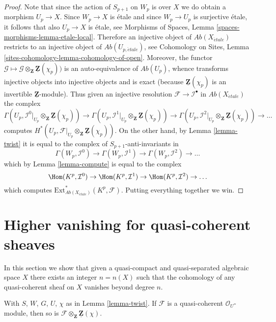 \begin{proof}
Note that since the action of $S_{p + 1}$ on $W_p$ is over $X$ we do
obtain a morphism $U_p \to X$. Since $W_p \to X$ is \'etale and since
$W_p \to U_p$ is surjective \'etale, it follows
that also $U_p \to X$ is \'etale, see
Morphisms of Spaces, Lemma \ref{spaces-morphisms-lemma-etale-local}.
Therefore an injective object of
$\textit{Ab}(X_{\acute{e}tale})$ restricts to an injective object of
$\textit{Ab}(U_{p, \acute{e}tale})$, see
Cohomology on Sites, Lemma \ref{sites-cohomology-lemma-cohomology-of-open}.
Moreover, the functor
$\mathcal{G} \mapsto
\mathcal{G} \otimes_\mathbf{Z} \underline{\mathbf{Z}}(\chi_p))$
is an auto-equivalence of $\textit{Ab}(U_p)$, whence transforms injective
objects into injective objects and is exact (because
$\underline{\mathbf{Z}}(\chi_p)$ is an invertible
$\underline{\mathbf{Z}}$-module). Thus given an injective resolution
$\mathcal{F} \to \mathcal{I}^\bullet$ in $\textit{Ab}(X_{\acute{e}tale})$
the complex
$$
\Gamma(U_p,
\mathcal{I}^0|_{U_p} \otimes_\mathbf{Z} \underline{\mathbf{Z}}(\chi_p))
\to
\Gamma(U_p,
\mathcal{I}^1|_{U_p} \otimes_\mathbf{Z} \underline{\mathbf{Z}}(\chi_p))
\to
\Gamma(U_p,
\mathcal{I}^2|_{U_p} \otimes_\mathbf{Z} \underline{\mathbf{Z}}(\chi_p))
\to \ldots
$$
computes
$H^*(U_p,
\mathcal{F}|_{U_p} \otimes_\mathbf{Z} \underline{\mathbf{Z}}(\chi_p))$.
On the other hand, by
Lemma \ref{lemma-twist}
it is equal to the complex of $S_{p + 1}$-anti-invariants in
$$
\Gamma(W_p, \mathcal{I}^0) \to
\Gamma(W_p, \mathcal{I}^1) \to
\Gamma(W_p, \mathcal{I}^2) \to \ldots
$$
which by
Lemma \ref{lemma-compute}
is equal to the complex
$$
\Hom(K^p, \mathcal{I}^0) \to
\Hom(K^p, \mathcal{I}^1) \to
\Hom(K^p, \mathcal{I}^2) \to \ldots
$$
which computes
$\text{Ext}^*_{\textit{Ab}(X_{\acute{e}tale})}(K^p, \mathcal{F})$.
Putting everything together we win.
\end{proof}





\section{Higher vanishing for quasi-coherent sheaves}
\label{section-higher-vanishing}

\noindent
In this section we show that given a quasi-compact and
quasi-separated algebraic space $X$ there exists an integer
$n = n(X)$ such that the cohomology of any quasi-coherent
sheaf on $X$ vanishes beyond degree $n$.

\begin{lemma}
\label{lemma-quasi-coherent-twist}
With $S$, $W$, $G$, $U$, $\chi$ as in
Lemma \ref{lemma-twist}.
If $\mathcal{F}$ is a quasi-coherent $\mathcal{O}_U$-module,
then so is $\mathcal{F} \otimes_{\mathbf{Z}} \underline{\mathbf{Z}}(\chi)$.
\end{lemma}

